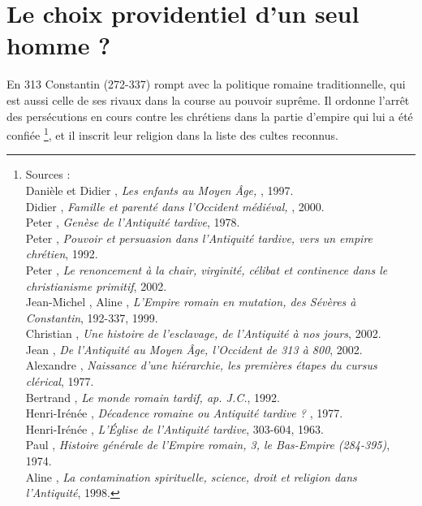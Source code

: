 \section{Le choix providentiel d'un seul homme ?}
En 313  Constantin (272-337) rompt avec la politique romaine traditionnelle, qui est aussi celle de ses rivaux dans la course au pouvoir suprême. Il ordonne l'arrêt des persécutions en cours contre les chrétiens dans la partie d'empire qui lui a été confiée \footnote{Sources :
\\Danièle  et Didier , \emph{Les enfants au Moyen Âge, }, 1997.
\\Didier {}, \emph{Famille et parenté dans l'Occident médiéval, }, 2000.
\\Peter {}, \emph{Genèse de l'Antiquité tardive}, 1978.
\\Peter {}, \emph{Pouvoir et persuasion dans l'Antiquité tardive, vers un empire chrétien}, 1992.
\\Peter {}, \emph{Le renoncement à la chair, virginité, célibat et continence dans le christianisme primitif}, 2002.
\\Jean-Michel , Aline , \emph{L'Empire romain en mutation, des Sévères à Constantin}, 192-337, 1999.
\\Christian {}, \emph{Une histoire de l'esclavage, de l'Antiquité à nos jours}, 2002.
\\Jean {}, \emph{De l'Antiquité au Moyen Âge, l'Occident de 313 à 800}, 2002.
\\Alexandre {}, \emph{Naissance d'une hiérarchie, les premières étapes du cursus clérical}, 1977.
\\Bertrand {}, \emph{Le monde romain tardif,  ap. J.C.}, 1992.
\\Henri-Irénée , \emph{Décadence romaine ou Antiquité tardive ? }, 1977.
\\Henri-Irénée , \emph{L'Église de l'Antiquité tardive}, 303-604, 1963.
\\Paul {}, \emph{Histoire générale de l'Empire romain, 3, le Bas-Empire (284-395)}, 1974.
\\Aline {}, \emph{La contamination spirituelle, science, droit et religion dans l'Antiquité}, 1998.},
et il inscrit leur religion dans la liste des cultes reconnus. 

